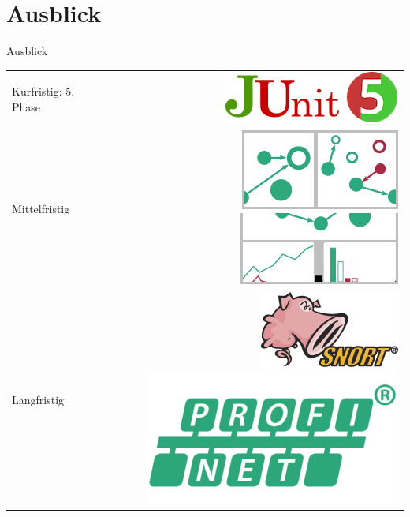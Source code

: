\documentclass[18pt]{beamer}
\begin{document}
\section{Ausblick}
\begin{frame}{Ausblick}
	\begin{tabular}{m{5cm}r}
		Kurfristig: 5. Phase & \includegraphics[width=0.3\linewidth]{images/max-junit} \vspace{0.5cm}\\
		\pause
		Mittelfristig & \includegraphics[width=0.2\linewidth]{images/max-tiling} \hspace{0.5cm} \includegraphics[width=0.2\linewidth]{images/max-stats} \vspace{0.3cm}\\
		\pause
		Langfristig & \includegraphics[width=0.2\linewidth]{images/max-snort} \hspace{0.5cm} \includegraphics[width=0.2\linewidth]{images/max-profinet} \\
	\end{tabular}
\end{frame}


\appendix
\beginbackup


\backupend
\end{document}
